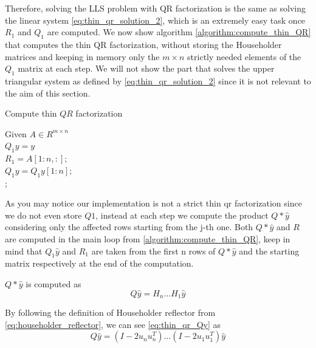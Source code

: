 \noindent Therefore, solving the LLS problem with QR factorization is the same as solving the linear system \eqref{eq:thin_qr_solution_2}, which is an extremely easy task once $R_1$ and $Q_1$ are computed.
We now show algorithm \ref{algorithm:compute_thin_QR} that computes the thin QR factorization, without storing the Householder matrices and keeping in memory only the $m \times n$ strictly needed elements of the $Q_1$ matrix at each step. We will not show the part that solves the upper triangular system as defined by \eqref{eq:thin_qr_solution_2} since it is not relevant to the aim of this section.

\begin{algorithm}[H]
    \caption{Compute thin $QR$ factorization}
    \label{algorithm:compute_thin_QR}
    Given $A \in R^{m \times n}$\\
    $Q_{1}y = y$\\
    $R_1=A[1:n,:];$\\
    $Q_{1}y = Q_{1}y[1:n];$ \\
    ;
\end{algorithm}

\noindent As you may notice our implementation is not a strict thin qr factorization since we do not even store $Q1$, instead at each step we compute the product $Q*\hat{y}$ considering only the affected rows starting from the j-th one. Both $Q*\hat{y}$ and $R$ are computed in the main loop from \autoref{algorithm:compute_thin_QR}, keep in mind that $Q_1\hat{y}$ and $R_1$ are taken from the first n rows of $Q*\hat{y}$ and the starting matrix respectively at the end of the computation.
\vspace{3mm}

\noindent $Q*\hat{y}$ is computed as
\begin{equation}
    Q\hat{y}=H_n\dots H_1\hat{y}
    \label{eq:thin_qr_Qy}
\end{equation}

\noindent By following the definition of Householder reflector from \eqref{eq:householder_reflector}, we can see \eqref{eq:thin_qr_Qy} as
\begin{equation}
    Q\hat{y}=(I-2u_nu_n^T)\dots (I-2u_1u_1^T)\hat{y}
    \label{eq:thin_qr_Qy_reflectors}
\end{equation}

